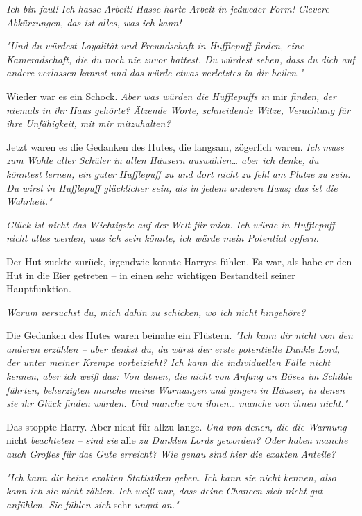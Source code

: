 {\emph{Ich bin faul! Ich hasse Arbeit! Hasse harte Arbeit in jedweder Form! Clevere Abkürzungen, das ist alles, was ich kann!}

\emph{"Und du würdest Loyalität und Freundschaft in Hufflepuff finden, eine Kameradschaft, die du noch nie zuvor hattest. Du würdest sehen, dass du dich auf andere verlassen kannst und das würde etwas verletztes in dir heilen."}

Wieder war es ein Schock. \emph{Aber was würden die Hufflepuffs in} mir \emph{finden, der niemals in ihr Haus gehörte? Ätzende Worte, schneidende Witze, Verachtung für ihre Unfähigkeit, mit mir mitzuhalten?}

Jetzt waren es die Gedanken des Hutes, die langsam, zögerlich waren. \emph{Ich muss zum Wohle aller Schüler in allen Häusern auswählen… aber ich denke, du könntest lernen, ein guter Hufflepuff zu und dort nicht zu fehl am Platze zu sein. Du wirst in Hufflepuff glücklicher sein, als in jedem anderen Haus; das ist die Wahrheit."}

\emph{Glück ist nicht das Wichtigste auf der Welt für mich. Ich würde in Hufflepuff nicht alles werden, was ich sein könnte, ich würde mein Potential opfern.}

Der Hut zuckte zurück, irgendwie konnte Harryes fühlen. Es war, als habe er den Hut in die Eier getreten -- in einen sehr wichtigen Bestandteil seiner Hauptfunktion.

\emph{Warum versuchst du, mich dahin zu schicken, wo ich nicht hingehöre?}

Die Gedanken des Hutes waren beinahe ein Flüstern. \emph{"Ich kann dir nicht von den anderen erzählen -- aber denkst du, du wärst der erste potentielle Dunkle Lord, der unter meiner Krempe vorbeizieht? Ich kann die individuellen Fälle nicht kennen, aber ich weiß das: Von denen, die nicht von Anfang an Böses im Schilde führten, beherzigten manche meine Warnungen und gingen in Häuser, in denen sie ihr Glück finden würden. Und manche von ihnen… manche von ihnen nicht."}

Das stoppte Harry. Aber nicht für allzu lange. \emph{Und von denen, die die Warnung} nicht \emph{beachteten -- sind sie} alle \emph{zu Dunklen Lords geworden? Oder haben manche auch Großes für das Gute erreicht? Wie genau sind hier die exakten Anteile?}

\emph{"Ich kann dir keine exakten Statistiken geben. Ich kann sie nicht kennen, also kann ich sie nicht zählen. Ich weiß nur, dass deine Chancen sich nicht gut anfühlen. Sie fühlen sich} sehr \emph{ungut an."}

}
